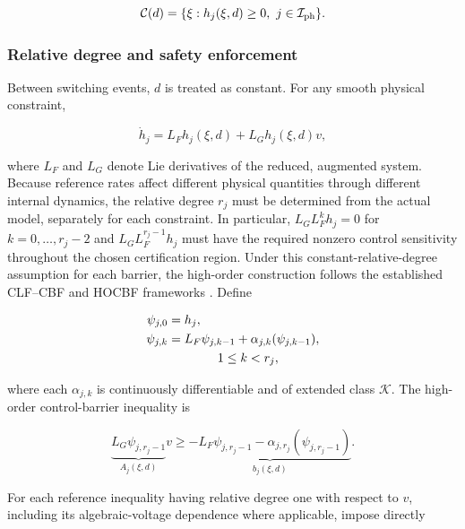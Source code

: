 \documentclass[11pt,twocolumn]{article}
\begin{document}
\begin{equation}\label{eq:cphys}
\mathcal C(d)=\{\xi:h_j(\xi,d)\geq0,\ j\in\mathcal I_{\rm ph}\}.
\end{equation}

\subsubsection{Relative degree and safety enforcement}

Between switching events, $d$ is treated as constant. For any smooth physical constraint,

\begin{equation}\label{eq:hdot}
\dot h_j=L_Fh_j(\xi,d)+L_Gh_j(\xi,d)v,
\end{equation}

where $L_F$ and $L_G$ denote Lie derivatives of the reduced, augmented system. Because reference rates affect different physical quantities through different internal dynamics, the relative degree $r_j$ must be determined from the actual model, separately for each constraint. In particular, $L_G L_F^k h_j=0$ for $k=0,\ldots,r_j-2$ and $L_G L_F^{r_j-1}h_j$ must have the required nonzero control sensitivity throughout the chosen certification region. Under this constant-relative-degree assumption for each barrier, the high-order construction follows the established CLF--CBF and HOCBF frameworks \cite{AmesEtAl2017CBF,XiaoBelta2022HOCBF}. Define

\begin{equation}\label{eq:hocbf-recursion}
\begin{aligned}
\psi_{j,0}&=h_j,\\
\psi_{j,k}&=L_F\psi_{j,k-1}
+\alpha_{j,k}(\psi_{j,k-1}),\\
&\hspace{14mm}1\leq k<r_j,
\end{aligned}
\end{equation}

where each $\alpha_{j,k}$ is continuously differentiable and of extended class $\mathcal K$. The high-order control-barrier inequality is

\begin{equation}\label{eq:hocbf-affine}
\underbrace{L_G\psi_{j,r_j-1}}_{A_j(\xi,d)}v\geq
\underbrace{-L_F\psi_{j,r_j-1}-\alpha_{j,r_j}(\psi_{j,r_j-1})}_{b_j(\xi,d)}.
\end{equation}

For each reference inequality having relative degree one with respect to $v$, including its algebraic-voltage dependence where applicable, impose directly
\end{document}
